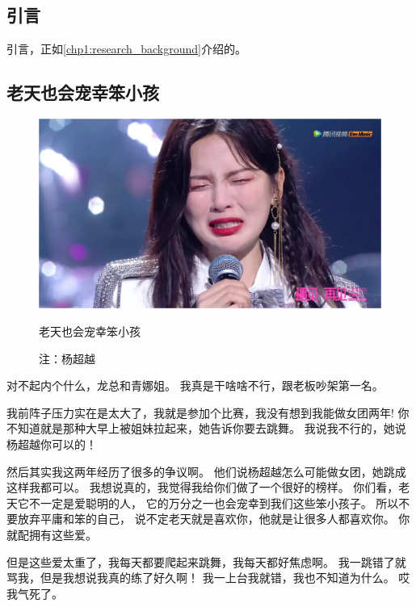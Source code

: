 \ifx\mainpage\undefined
\def\chpTwo{chpTwo}

\else
\graphicspath{{./chapter2/}}
\glsresetall
\fi

\chapter{\chptitleTwo}
\label{chp2}
%
\section{引言}
\label{chp2:intro}
%
引言，正如\cref{chp1:research_background}介绍的。

\section{老天也会宠幸笨小孩}
\label{chp2:lucky_girl}

\begin{figure}[htb]
\centering
\includegraphics[scale=0.2]{chp2_figures/chaoyue}
\caption[老天也会宠幸笨小孩]{老天也会宠幸笨小孩}
\caption*{注：杨超越}
\label{chp2:fig:chaoyue}
\end{figure}

对不起内个什么，龙总和青娜姐。
我真是干啥啥不行，跟老板吵架第一名。

我前阵子压力实在是太大了，我就是参加个比赛，我没有想到我能做女团两年!
你不知道就是那种大早上被姐妹拉起来，她告诉你要去跳舞。
我说我不行的，她说杨超越你可以的！

然后其实我这两年经历了很多的争议啊。
他们说杨超越怎么可能做女团，她跳成这样我都可以。
我想说真的，我觉得我给你们做了一个很好的榜样。
你们看，老天它不一定是爱聪明的人，
它的万分之一也会宠幸到我们这些笨小孩子。
所以不要放弃平庸和笨的自己，
说不定老天就是喜欢你，他就是让很多人都喜欢你。
你就配拥有这些爱。

但是这些爱太重了，我每天都要爬起来跳舞，我每天都好焦虑啊。
我一跳错了就骂我，但是我想说我真的练了好久啊！
我一上台我就错，我也不知道为什么。
哎我气死了。

